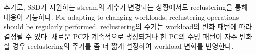 {\color{blue} 추가로, SSD가 지원하는 stream의 개수가 변경되는 상황에서도 reclustering을 통해
대응이 가능하다.
For adapting to changing workloads, reclustering operations should be regularly performed. 
reclustering의 주기는 workload의 변화 패턴에 따라 결정될 수 있다.
새로운 PC가 계속적으로 생성되거나 한 PC의 수명 패턴이 자주 변화할 경우 reclustering의 주기를 
좀 더 짧게 설정하여 workload 변화를 반영한다.
}


